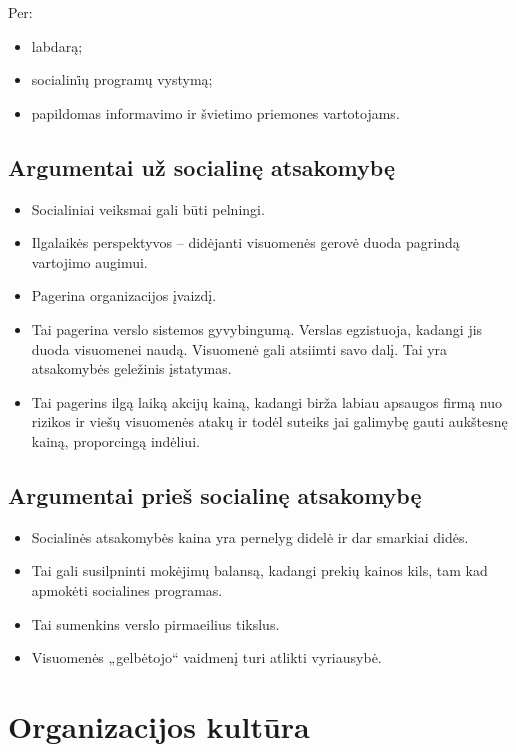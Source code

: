 Per:
\begin{itemize}
  \item labdarą;
  \item socialini̇ų programų vystymą;
  \item papildomas informavimo ir švietimo priemones vartotojams.
\end{itemize}

\section{Argumentai už socialinę atsakomybę}

\begin{itemize}
  \item Socialiniai veiksmai gali būti pelningi.
  \item Ilgalaikės perspektyvos – didėjanti visuomenės gerovė duoda
    pagrindą vartojimo augimui.
  \item Pagerina organizacijos įvaizdį.
  \item Tai pagerina verslo sistemos gyvybingumą. Verslas egzistuoja,
    kadangi jis duoda visuomenei naudą. Visuomenė gali atsiimti savo
    dalį. Tai yra atsakomybės geležinis įstatymas.
  \item Tai pagerins ilgą laiką akcijų kainą, kadangi birža labiau
    apsaugos firmą nuo rizikos ir viešų visuomenės atakų ir todėl
    suteiks jai galimybę gauti aukštesnę kainą, proporcingą indėliui.
\end{itemize}

\section{Argumentai prieš socialinę atsakomybę}

\begin{itemize}
  \item Socialinės atsakomybės kaina yra pernelyg didelė ir dar smarkiai
    didės.
  \item Tai gali susilpninti mokėjimų balansą, kadangi prekių kainos kils,
    tam kad apmokėti socialines programas.
  \item Tai sumenkins verslo pirmaeilius tikslus.
  \item Visuomenės „gelbėtojo“ vaidmenį turi atlikti vyriausybė.
\end{itemize}

\chapter{Organizacijos kultūra}

